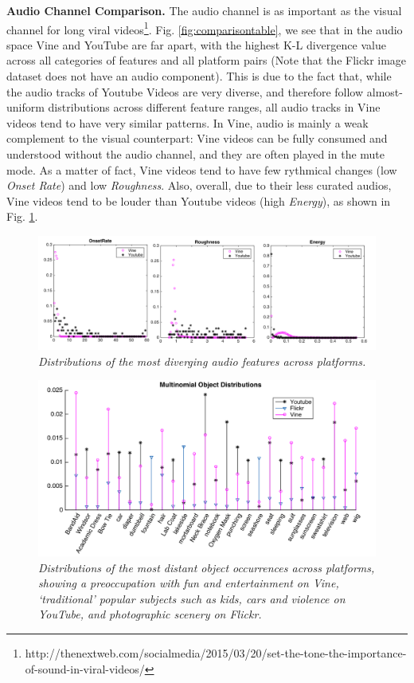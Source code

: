 \noindent\textbf{Audio Channel Comparison.} 
The audio channel is as important as the visual channel for long viral videos\footnote{\scriptsize http://thenextweb.com/socialmedia/2015/03/20/set-the-tone-the-importance-of-sound-in-viral-videos/}. Fig. \ref{fig:comparisontable}, we see that in the audio space Vine and YouTube are far apart, with the highest K-L divergence value across all categories of features and all platform pairs (Note that the Flickr image dataset does not have an audio component). This is due to the fact that, while the audio tracks of Youtube Videos are very diverse, and therefore follow almost-uniform distributions across different feature ranges, all audio tracks in Vine videos tend to have very similar patterns. In Vine, audio is mainly a weak complement to the visual counterpart: Vine videos can be fully consumed and understood without the audio channel, and they are often played in the mute mode. As a matter of fact, Vine videos tend to have few rythmical changes (low \emph{Onset Rate}) and low \emph{Roughness}. Also, overall, due to their less curated audios, Vine videos tend to be louder than Youtube videos (high \emph{Energy}), as shown in Fig. \ref{fig:comparison_audio}.

\begin{figure}[!htb]
\centering
\includegraphics[width=\columnwidth]{plots/comparison/audio}
\caption{\textsl{ Distributions of the most diverging audio features across platforms.}}
\label{fig:comparison_audio}
\end{figure}

\begin{figure}[!htb]
\centering
\includegraphics[width=\columnwidth]{plots/comparison/objects}
\caption{\textsl{ Distributions of the most distant object occurrences across platforms, showing a preoccupation with fun and entertainment on Vine, `traditional' popular subjects such as kids, cars and violence on YouTube, and photographic scenery on Flickr.}}
\label{fig:comparison_objects}
\end{figure}

